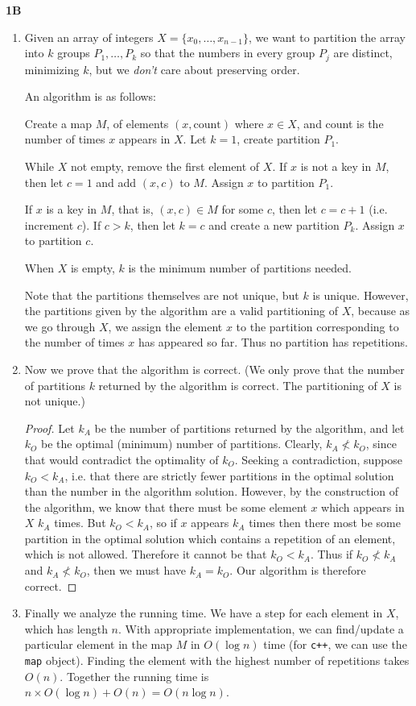 \documentclass[11pt]{article}
\begin{document}
\pagebreak
\textbf{1B}
\begin{enumerate}
\item Given an array of integers $X = \{x_0, \dots, x_{n-1}\}$, we want to partition the array into $k$ groups $P_1, \dots, P_k$ so that the numbers in every group $P_j$ are distinct, minimizing $k$, but we \textit{don't} care about preserving order. 

An algorithm is as follows:

Create a map $M$, of elements $(x, \textrm{count})$ where $x \in X$, and count is the number of times $x$ appears in $X$. Let $k = 1$, create partition $P_1$. 

While $X$ not empty, remove the first element of $X$. If $x$ is not a key in $M$, then let $c = 1$ and add $(x, c)$ to $M$. Assign $x$ to partition $P_1$.

If $x$ is a key in $M$, that is, $(x, c) \in M$ for some $c$, then let $c = c + 1$ (i.e. increment $c$). If $c > k$, then let $k = c$ and create a new partition $P_k$. Assign $x$ to partition $c$. 

When $X$ is empty, $k$ is the minimum number of partitions needed. 

Note that the partitions themselves are not unique, but $k$ is unique. However, the partitions given by the algorithm are a valid partitioning of $X$, because as we go through $X$, we assign the element $x$ to the partition corresponding to the number of times $x$ has appeared so far. Thus no partition has repetitions. 

\item Now we prove that the algorithm is correct. (We only prove that the number of partitions $k$ returned by the algorithm is correct. The partitioning of $X$ is not unique.)

\begin{proof} 
Let $k_A$ be the number of partitions returned by the algorithm, and let $k_O$ be the optimal (minimum) number of partitions. Clearly, $k_A \not<k_O$, since that would contradict the optimality of $k_O$. Seeking a contradiction, suppose $k_O<k_A$, i.e. that there are strictly fewer partitions in the optimal solution than the number in the algorithm solution. However, by the construction of the algorithm, we know that there must be some element $x$ which appears in $X$ $k_A$ times. But $k_O<k_A$, so if $x$ appears $k_A$ times then there most be some partition in the optimal solution which contains a repetition of an element, which is not allowed. Therefore it cannot be that $k_O<k_A$.  Thus if $k_O \not<k_A$ and $k_A \not<k_O$, then we must have $k_A = k_O$. Our algorithm is therefore correct.
\end{proof}

\item Finally we analyze the running time. We have a step for each element in $X$, which has length $n$. With appropriate implementation, we can find/update a particular element in the map $M$ in $O(\log n)$ time (for \verb|c++|, we can use the \verb|map| object). Finding the element with the highest number of repetitions takes $O(n)$. Together the running time is $n\times O(\log n) + O(n) = O(n\log n)$. 
\end{enumerate}
\end{document}
